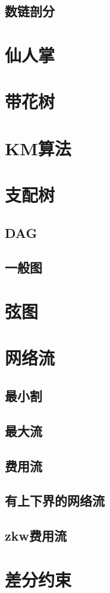 \subsection{数链剖分}
\section{仙人掌}
\section{带花树}
\section{KM算法}
\section{支配树}
\subsection{DAG}
\subsection{一般图}
\section{弦图}
\section{网络流}
\subsection{最小割}
\subsection{最大流}
\subsection{费用流}
\subsection{有上下界的网络流}
\subsection{zkw费用流}
\section{差分约束}